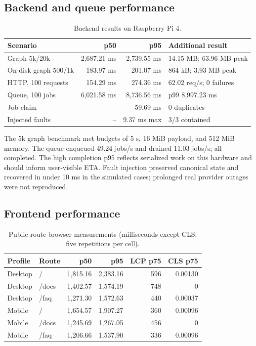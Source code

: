 \documentclass{sbc2023}
\begin{document}
\subsection{Backend and queue performance}

\begin{table}[!htbp]
\caption{Backend results on Raspberry Pi 4.}
\label{tab:backend}
\centering
\scriptsize
\begin{tabularx}{\columnwidth}{YrrY}
\toprule
Scenario & p50 & p95 & Additional result \\
\midrule
Graph 5k/20k & 2,687.21 ms & 2,739.55 ms & 14.15 MB; 63.96 MB peak \\
On-disk graph 500/1k & 183.97 ms & 201.07 ms & 864 kB; 3.93 MB peak \\
HTTP, 100 requests & 154.29 ms & 274.36 ms & 62.02 req/s; 0 failures \\
Queue, 100 jobs & 6,021.58 ms & 8,736.56 ms & p99 8,997.23 ms \\
Job claim & -- & 59.69 ms & 0 duplicates \\
Injected faults & -- & 9.37 ms max & 3/3 contained \\
\bottomrule
\end{tabularx}
\end{table}

The 5k graph benchmark met budgets of 5 s, 16 MiB payload, and 512 MiB memory. The queue enqueued
49.24 jobs/s and drained 11.03 jobs/s; all completed. The high completion p95 reflects serialized
work on this hardware and should inform user-visible ETA. Fault injection preserved canonical
state and recovered in under 10 ms in the simulated cases; prolonged real provider outages were
not reproduced.

\subsection{Frontend performance}

\begin{table}[!htbp]
\caption{Public-route browser measurements (milliseconds except CLS; five repetitions per cell).}
\label{tab:frontend}
\centering
\scriptsize
\setlength{\tabcolsep}{2.5pt}
\begin{tabularx}{\columnwidth}{p{1.05cm}p{0.72cm}rrrr}
\toprule
Profile & Route & p50 & p95 & LCP p75 & CLS p75 \\
\midrule
Desktop & / & 1,815.16 & 2,383.16 & 596 & 0.00130 \\
Desktop & /docs & 1,402.57 & 1,574.19 & 748 & 0 \\
Desktop & /faq & 1,271.30 & 1,572.63 & 440 & 0.00037 \\
Mobile & / & 1,654.57 & 1,907.27 & 360 & 0.00096 \\
Mobile & /docs & 1,245.69 & 1,267.05 & 456 & 0 \\
Mobile & /faq & 1,206.66 & 1,537.90 & 336 & 0.00096 \\
\bottomrule
\end{tabularx}
\end{table}
\end{document}
